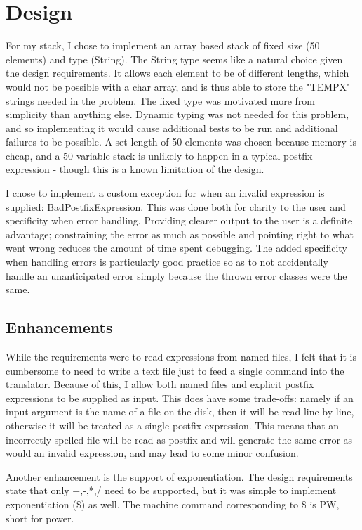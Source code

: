 \documentclass[a4paper,12pt]{article}
\begin{document}

\section{Design}
For my stack, I chose to implement an array based stack of fixed size (50 elements) and type (String).  The String type seems
like a natural choice given the design requirements.  It allows each element to be of different lengths, which would not be possible
with a char array, and is thus able to store the "TEMPX" strings needed in the problem.  The fixed type was motivated more from 
simplicity than anything else.  Dynamic typing was not needed for this problem, and so implementing it would cause additional tests
to be run and additional failures to be possible.  A set length of 50 elements was chosen because memory is cheap, and a 50 
variable stack is unlikely to happen in a typical postfix expression - though this is a known limitation of the design.

I chose to implement a custom exception for when an invalid expression is supplied: BadPostfixExpression.  This was done both for clarity to the user and specificity when error handling.  
Providing clearer output to the user is a definite advantage; constraining the error as much as possible and pointing right to what went
wrong reduces the amount of time spent debugging.  The added specificity when handling errors is particularly good practice
so as to not accidentally handle an unanticipated error simply because the thrown error classes were the same.

\subsection{Enhancements}
While the requirements were to read expressions from named files, I felt that it is cumbersome to need to write a text
file just to feed a single command into the translator.  Because of this, I allow both named files and explicit postfix expressions to be 
supplied as input.  This does have some trade-offs: namely if an input argument is the name of a file on the disk, then it 
will be read line-by-line, otherwise it will be treated as a single postfix expression.  This means that an incorrectly spelled file
will be read as postfix and will generate the same error as would an invalid expression, and may lead to some minor confusion.

Another enhancement is the support of exponentiation.  The design requirements state that only +,-,*,/ need to be supported,
but it was simple to implement exponentiation (\$) as well.  The machine command corresponding to \$ is PW, short for power.  
\end{document}
